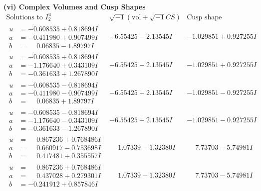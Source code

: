 \documentclass[1p]{elsarticle_modified}
\theoremstyle{definition}
\newcommand{\I}{\sqrt{-1}}
\begin{document}
\newpage\flushleft \textbf{(vi) Complex Volumes and Cusp Shapes}
$$\begin{array}{c|c|c}  
\text{Solutions to }I^u_{2}& \I (\text{vol} + \sqrt{-1}CS) & \text{Cusp shape}\\
 \hline 
\begin{aligned}
u &= -0.608535 + 0.818694 I \\
a &= -0.411980 + 0.907499 I \\
b &= \phantom{-}0.06835 - 1.89797 I\end{aligned}
 & -6.55425 - 2.13545 I & -1.029851 + 0.927255 I \\ \hline\begin{aligned}
u &= -0.608535 + 0.818694 I \\
a &= -1.176640 + 0.343109 I \\
b &= -0.361633 + 1.267890 I\end{aligned}
 & -6.55425 - 2.13545 I & -1.029851 + 0.927255 I \\ \hline\begin{aligned}
u &= -0.608535 - 0.818694 I \\
a &= -0.411980 - 0.907499 I \\
b &= \phantom{-}0.06835 + 1.89797 I\end{aligned}
 & -6.55425 + 2.13545 I & -1.029851 - 0.927255 I \\ \hline\begin{aligned}
u &= -0.608535 - 0.818694 I \\
a &= -1.176640 - 0.343109 I \\
b &= -0.361633 - 1.267890 I\end{aligned}
 & -6.55425 + 2.13545 I & -1.029851 - 0.927255 I \\ \hline\begin{aligned}
u &= \phantom{-}0.867236 + 0.768486 I \\
a &= \phantom{-}0.660917 - 0.753698 I \\
b &= \phantom{-}0.417481 + 0.355557 I\end{aligned}
 & \phantom{-}1.07339 - 1.32380 I & \phantom{-}7.73703 - 5.74981 I \\ \hline\begin{aligned}
u &= \phantom{-}0.867236 + 0.768486 I \\
a &= \phantom{-}0.437028 + 0.279301 I \\
b &= -0.241912 + 0.857846 I\end{aligned}
 & \phantom{-}1.07339 - 1.32380 I & \phantom{-}7.73703 - 5.74981 I \\ \hline\begin{aligned}

\end{aligned}
\end{array}$$
\end{document}
